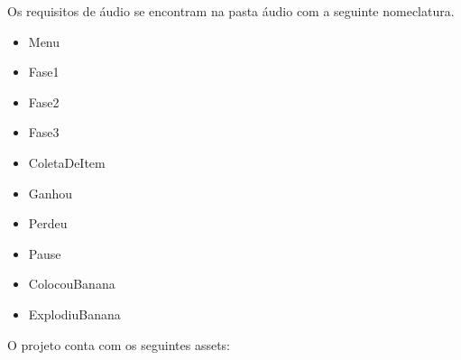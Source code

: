 \documentclass[12pt]{article}
\begin{document}
	Os requisitos de áudio se encontram na pasta áudio
	com a seguinte nomeclatura.

	\begin{itemize}
		\item Menu
		\item Fase1
		\item Fase2
		\item Fase3
		\item ColetaDeItem
		\item Ganhou
		\item Perdeu
		\item Pause
		\item ColocouBanana
		\item ExplodiuBanana
	\end{itemize}

	O projeto conta com os seguintes assets:
\end{document}
